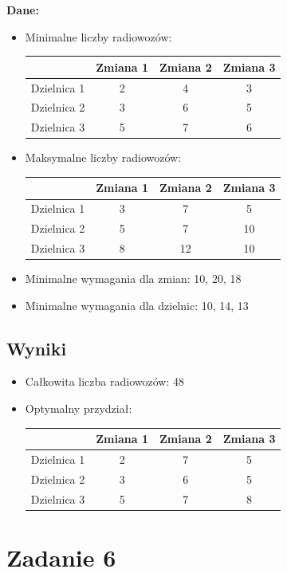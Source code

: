\documentclass[a4paper,12pt]{article}
\begin{document}
\textbf{Dane:}
\begin{itemize}
\item Minimalne liczby radiowozów:
\begin{center}
\begin{tabular}{c|ccc}
& Zmiana 1 & Zmiana 2 & Zmiana 3 \\
\hline
Dzielnica 1 & 2 & 4 & 3 \\
Dzielnica 2 & 3 & 6 & 5 \\
Dzielnica 3 & 5 & 7 & 6 \\
\end{tabular}
\end{center}
\item Maksymalne liczby radiowozów:
\begin{center}
\begin{tabular}{c|ccc}
& Zmiana 1 & Zmiana 2 & Zmiana 3 \\
\hline
Dzielnica 1 & 3 & 7 & 5 \\
Dzielnica 2 & 5 & 7 & 10 \\
Dzielnica 3 & 8 & 12 & 10 \\
\end{tabular}
\end{center}
\item Minimalne wymagania dla zmian: 10, 20, 18
\item Minimalne wymagania dla dzielnic: 10, 14, 13
\end{itemize}

\subsection*{Wyniki}
\begin{itemize}
\item Całkowita liczba radiowozów: 48
\item Optymalny przydział:
\begin{center}
\begin{tabular}{c|ccc}
& Zmiana 1 & Zmiana 2 & Zmiana 3 \\
\hline
Dzielnica 1 & 2 & 7 & 5 \\
Dzielnica 2 & 3 & 6 & 5 \\
Dzielnica 3 & 5 & 7 & 8 \\
\end{tabular}
\end{center}
\end{itemize}

\section*{Zadanie 6}
\end{document}
